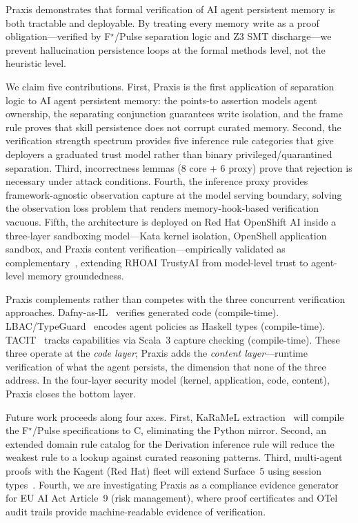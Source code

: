 \documentclass[sigplan,screen,nonacm]{acmart}
\newcommand{\fstar}{F\ensuremath{^\star}}
\begin{document}
Praxis demonstrates that formal verification of AI agent persistent memory
is both tractable and deployable. By treating every memory write as a proof
obligation---verified by \fstar{}/Pulse separation logic and Z3 SMT
discharge---we prevent hallucination persistence loops at the formal methods
level, not the heuristic level.

We claim five contributions. First, Praxis is the first application of
separation logic to AI agent persistent memory: the points-to assertion
models agent ownership, the separating conjunction guarantees write
isolation, and the frame rule proves that skill persistence does not corrupt
curated memory. Second, the verification strength spectrum provides five
inference rule categories that give deployers a graduated trust model rather
than binary privileged/quarantined separation. Third, incorrectness lemmas
(8 core + 6 proxy) prove that rejection is necessary under attack
conditions. Fourth, the inference proxy provides framework-agnostic
observation capture at the model serving boundary, solving the observation
loss problem that renders memory-hook-based verification vacuous. Fifth, the
architecture is deployed on Red Hat OpenShift AI inside a three-layer
sandboxing model---Kata kernel isolation, OpenShell application sandbox,
and Praxis content verification---empirically validated as
complementary~\cite{osc2026layered}, extending RHOAI TrustyAI from
model-level trust to agent-level memory groundedness.

Praxis complements rather than competes with the three concurrent
verification approaches. Dafny-as-IL~\cite{li2025dafny} verifies generated
code (compile-time). LBAC/TypeGuard~\cite{zhou2026lbac} encodes agent
policies as Haskell types (compile-time). TACIT~\cite{odersky2026tacit}
tracks capabilities via Scala~3 capture checking (compile-time). These
three operate at the \emph{code layer}; Praxis adds the \emph{content
layer}---runtime verification of what the agent persists, the dimension
that none of the three address. In the four-layer security model (kernel,
application, code, content), Praxis closes the bottom layer.

Future work proceeds along four axes. First, KaRaMeL
extraction~\cite{protzenko2017verified} will compile the \fstar{}/Pulse
specifications to C, eliminating the Python mirror. Second, an extended
domain rule catalog for the Derivation inference rule will reduce the
weakest rule to a lookup against curated reasoning patterns. Third,
multi-agent proofs with the Kagent (Red Hat) fleet will extend Surface~5
using session types~\cite{gay2026session}. Fourth, we are investigating
Praxis as a compliance evidence generator for EU AI Act Article~9 (risk
management), where proof certificates and OTel audit trails provide
machine-readable evidence of verification.




\end{document}
